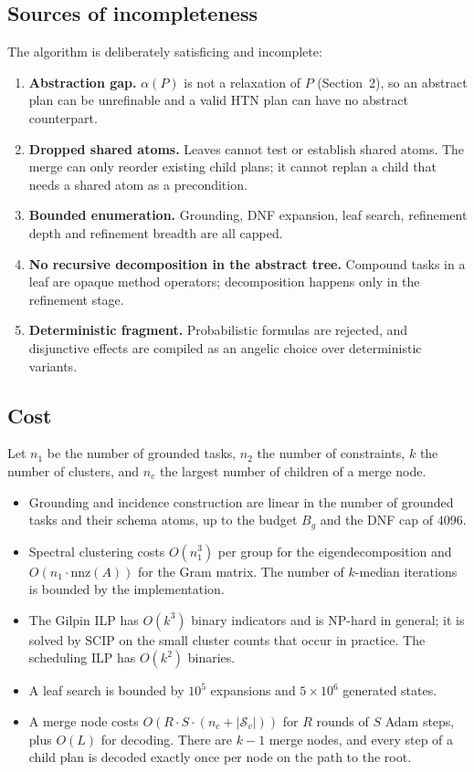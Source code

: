 \documentclass[11pt,a4paper]{article}
\newcommand{\cS}{\mathcal{S}}
\begin{document}
\subsection{Sources of incompleteness}
The algorithm is deliberately satisficing and incomplete:
\begin{enumerate}[leftmargin=1.6em,itemsep=2pt]
\item \textbf{Abstraction gap.} $\alpha(P)$ is not a relaxation of $P$
      (Section~2), so an abstract plan can be unrefinable and a valid HTN plan
      can have no abstract counterpart.
\item \textbf{Dropped shared atoms.} Leaves cannot test or establish shared
      atoms. The merge can only reorder existing child plans; it cannot
      replan a child that needs a shared atom as a precondition.
\item \textbf{Bounded enumeration.} Grounding, DNF expansion, leaf search,
      refinement depth and refinement breadth are all capped.
\item \textbf{No recursive decomposition in the abstract tree.} Compound
      tasks in a leaf are opaque method operators; decomposition happens only
      in the refinement stage.
\item \textbf{Deterministic fragment.} Probabilistic formulas are rejected,
      and disjunctive effects are compiled as an angelic choice over
      deterministic variants.
\end{enumerate}

\subsection{Cost}
Let $n_1$ be the number of grounded tasks, $n_2$ the number of constraints,
$k$ the number of clusters, and $n_c$ the largest number of children of a
merge node.
\begin{itemize}[leftmargin=1.6em,itemsep=1pt]
\item Grounding and incidence construction are linear in the number of
      grounded tasks and their schema atoms, up to the budget $B_g$ and the
      DNF cap of $4096$.
\item Spectral clustering costs $O(n_1^3)$ per group for the eigendecomposition
      and $O(n_1\cdot\mathrm{nnz}(A))$ for the Gram matrix. The number of
      $k$-median iterations is bounded by the implementation.
\item The Gilpin ILP has $O(k^3)$ binary indicators and is NP-hard in general;
      it is solved by SCIP on the small cluster counts that occur in practice.
      The scheduling ILP has $O(k^2)$ binaries.
\item A leaf search is bounded by $10^5$ expansions and $5\times10^6$
      generated states.
\item A merge node costs $O(R\cdot S\cdot(n_c+|\cS_v|))$ for $R$ rounds of
      $S$ Adam steps, plus $O(L)$ for decoding. There are $k-1$ merge nodes,
      and every step of a child plan is decoded exactly once per node on the
      path to the root.
\end{itemize}
\end{document}

